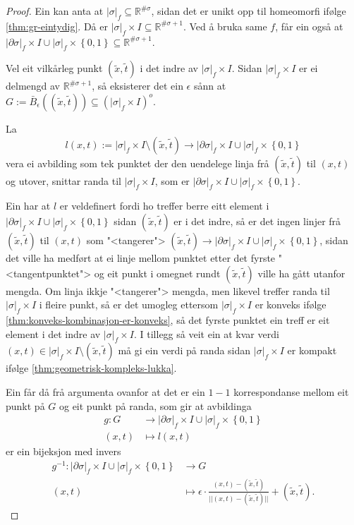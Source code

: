 \documentclass[a4paper, 12pt, norsk]{article}
\theoremstyle{plain}
\theoremstyle{definition}
\newcommand{\Rb}{\mathbb{R}}
\newcommand{\union}{ \mathop{\cup}\limits }
\newcommand{\gr}[1]{ \lvert #1 \rvert } %
\newcommand{\set}[1]{ \left\{ #1 \right\} } %
\newcommand{\tuple}[1]{ \left( #1 \right) } %
\begin{document}
\begin{proof}
	Ein kan anta at \( \gr{\sigma}_f \subseteq \Rb^{\#\sigma} \), sidan det er unikt opp til homeomorfi ifølge \autoref{thm:gr-eintydig}. Då er \( \gr{\sigma}_f \times I \subseteq \Rb^{\#\sigma+1} \). Ved å bruka same \( f \), får ein også at \( \gr{\partial\sigma}_f \times I \union \gr{\sigma}_f \times \set{0, 1} \subseteq \Rb^{\#\sigma+1} \).

	Vel eit vilkårleg punkt \( \tuple{\tilde{x}, \tilde{t}} \) i det indre av \( \gr{\sigma}_f \times I \). Sidan \( \gr{\sigma}_f \times I \) er ei delmengd av \( \Rb^{\#\sigma+1} \), så eksisterer det ein \( \epsilon \) sånn at \( G := \bar{B}_{\epsilon}\tuple{\tuple{\tilde{x}, \tilde{t}}} \subseteq \tuple{\gr{\sigma}_f \times I}^o \).
	
	La
	\[
		l(x,t) := \gr{\sigma}_f \times I \setminus \tuple{\tilde{x}, \tilde{t}} \to \gr{\partial\sigma}_f \times I \union \gr{\sigma}_f \times \set{0, 1}
	\] 
	vera ei avbilding som tek punktet der den uendelege linja frå \( \tuple{\tilde{x}, \tilde{t}} \) til \( \tuple{x,t} \) og utover, snittar randa til \( \gr{\sigma}_f \times I \), som er \( \gr{\partial\sigma}_f \times I \union \gr{\sigma}_f \times \set{0, 1} \).

	Ein har at \( l \) er veldefinert fordi ho treffer berre eitt element i \( \gr{\partial\sigma}_f \times I \union \gr{\sigma}_f \times \set{0, 1} \) sidan \( \tuple{\tilde{x}, \tilde{t}} \) er i det indre, så er det ingen linjer frå \( \tuple{\tilde{x}, \tilde{t}} \) til \( \tuple{x,t} \) som "<tangerer"> \( \tuple{\tilde{x}, \tilde{t}} \to \gr{\partial\sigma}_f \times I \union \gr{\sigma}_f \times \set{0, 1} \), sidan det ville ha medført at ei linje mellom punktet etter det fyrste "<tangentpunktet"> og eit punkt i omegnet rundt \( \tuple{\tilde{x}, \tilde{t}} \) ville ha gått utanfor mengda. Om linja ikkje "<tangerer"> mengda, men likevel treffer randa til \( \gr{\sigma}_f \times I \) i fleire punkt, så er det umogleg ettersom \( \gr{\sigma}_f \times I \) er konveks ifølge \autoref{thm:konveks-kombinasjon-er-konveks}, så det fyrste punktet ein treff er eit element i det indre av \( \gr{\sigma}_f \times I \). I tillegg så veit ein at kvar verdi \( (x,t) \in \gr{\sigma}_f \times I \setminus \tuple{\tilde{x}, \tilde{t}} \) må gi ein verdi på randa sidan \( \gr{\sigma}_f \times I \) er kompakt ifølge \autoref{thm:geometrisk-kompleks-lukka}.

	Ein får då frå argumenta ovanfor at det er ein \( 1 - 1 \) korrespondanse mellom eit punkt på \( G \) og eit punkt på randa, som gir at avbildinga
	\begin{align*}
		g: G &\to \gr{\partial\sigma}_f \times I \union \gr{\sigma}_f \times \set{0, 1} \\
		(x, t) &\mapsto l(x,t)
	\end{align*}
	er ein bijeksjon med invers
	\begin{align*}
		g^{-1}: \gr{\partial\sigma}_f \times I \union \gr{\sigma}_f \times \set{0, 1} &\to G \\
		(x, t) &\mapsto \epsilon\cdot\frac{(x,t)-\tuple{\tilde{x}, \tilde{t}}}{||(x,t)-\tuple{\tilde{x}, \tilde{t}}||} + \tuple{\tilde{x}, \tilde{t}}.
	\end{align*}
	

\end{proof}
\end{document}
